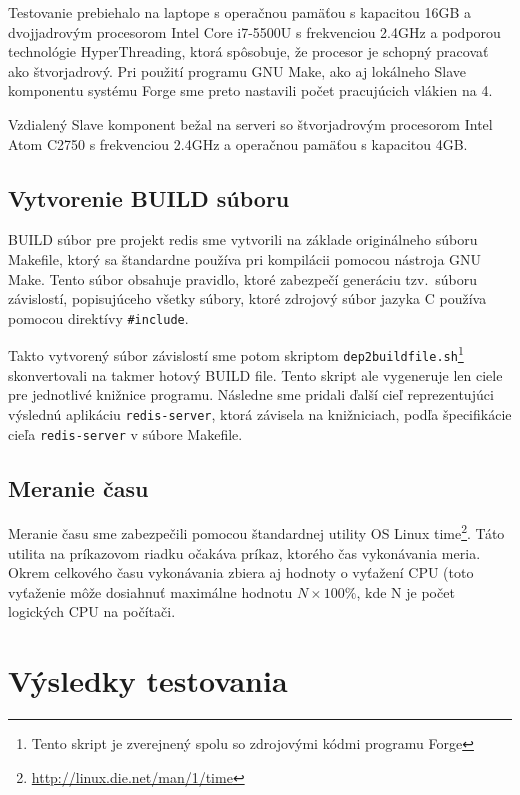 Testovanie prebiehalo na laptope s operačnou pamäťou s kapacitou 16GB a dvojjadrovým procesorom Intel Core i7-5500U s
frekvenciou 2.4GHz a podporou technológie HyperThreading, ktorá spôsobuje, že procesor je schopný pracovať
ako štvorjadrový. Pri použití programu GNU Make, ako aj lokálneho Slave komponentu
systému Forge sme preto nastavili počet pracujúcich vlákien na 4.

Vzdialený Slave komponent bežal na serveri so štvorjadrovým procesorom Intel Atom C2750 s
frekvenciou 2.4GHz a operačnou pamäťou s kapacitou 4GB.

\subsection{Vytvorenie BUILD s\'{u}boru}
\label{sec:process:buildfile}

BUILD súbor pre projekt redis sme vytvorili na základe originálneho súboru Makefile,
ktorý sa štandardne používa pri kompilácii pomocou nástroja GNU Make. Tento súbor
obsahuje pravidlo, ktoré zabezpečí generáciu tzv.\ súboru závislostí, popisujúceho
všetky súbory, ktoré zdrojový súbor jazyka C používa pomocou direktívy \texttt{\#include}.

Takto vytvorený súbor závislostí sme potom skriptom \texttt{dep2buildfile.sh}\footnote{Tento skript je zverejnený spolu so zdrojovými kódmi programu Forge}
skonvertovali na takmer hotový BUILD file. Tento skript ale vygeneruje len ciele pre jednotlivé knižnice
programu. Následne sme pridali ďalší cieľ reprezentujúci výslednú aplikáciu \texttt{redis-server},
ktorá závisela na knižniciach, podľa špecifikácie cieľa \texttt{redis-server} v súbore Makefile.

\subsection{Meranie \v{c}asu}
\label{sec:process:time}

Meranie času sme zabezpečili pomocou štandardnej utility OS Linux time\footnote{\url{http://linux.die.net/man/1/time}}.
Táto utilita na príkazovom riadku očakáva príkaz, ktorého čas vykonávania meria. Okrem celkového
času vykonávania zbiera aj hodnoty o vyťažení CPU (toto vyťaženie môže dosiahnuť
maximálne hodnotu $N\times100\%$, kde N je počet logických CPU na počítači.

\section{V\'{y}sledky testovania}
\label{sec:results}

